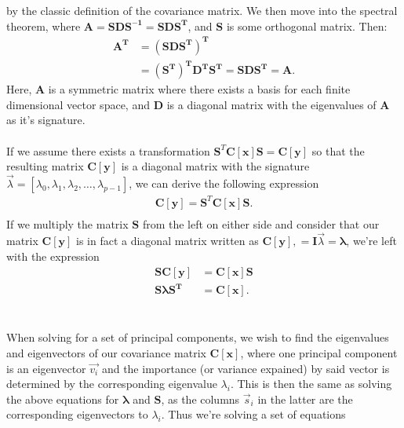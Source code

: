 by the classic definition of the covariance matrix. We then move into the spectral theorem, where $\boldsymbol{A} = \boldsymbol{SDS^{-1} = SD S^T}$, and $\boldsymbol{S}$ is some orthogonal matrix. Then:
\begin{equation}
\begin{split}
    \boldsymbol{A^T} & = \boldsymbol{(S D S^T)^{T}} \\ 
    & = \boldsymbol{ (S^T)^T D^T S^T =  S D S^T = A}.
\end{split}
\end{equation}
Here, $\boldsymbol{A}$ is a symmetric matrix where there exists a basis for each finite dimensional vector space, and $\boldsymbol{D}$ is a diagonal matrix with the eigenvalues of $\boldsymbol{A}$ as it's signature. 
\\
\\
If we assume there exists a transformation $\boldsymbol{S}^T\boldsymbol{C}[\boldsymbol{x}]\boldsymbol{S}=\boldsymbol{C}[\boldsymbol{y}]$ so that the resulting matrix $\boldsymbol{C}[\boldsymbol{y}]$ is a diagonal matrix with the signature $\vec{\lambda}= [\lambda_0,\lambda_1,\lambda_2,\dots,\lambda_{p-1}]$, 
we can derive the following expression
\begin{equation}
\begin{split}
\boldsymbol{C}[\boldsymbol{y}] = \boldsymbol{S}^T\boldsymbol{C}[\boldsymbol{x}]\boldsymbol{S}. \\
\end{split}
\end{equation}
If we multiply the matrix $\boldsymbol{S}$ from the left on either side and consider that our matrix $\boldsymbol{C}[\boldsymbol{y}]$ is in fact a diagonal matrix written as $\boldsymbol{C}[\boldsymbol{y}], = \boldsymbol{I}\vec{\lambda} = \boldsymbol{\lambda }$, we're left with the expression
\begin{equation}
\begin{split}
\boldsymbol{S}\boldsymbol{C}[\boldsymbol{y}] & = \boldsymbol{C}[\boldsymbol{x}]\boldsymbol{S} \\
\boldsymbol{S} \boldsymbol{\lambda}\boldsymbol{S^T} & = \boldsymbol{C}[\boldsymbol{x}].
\end{split}
\end{equation}
\\
\\
When solving for a set of principal components, we wish to find the eigenvalues and eigenvectors of our covariance matrix $\boldsymbol{C[x]}$, where one principal component is an eigenvector $\vec{v_i}$ and the importance (or variance expained) by said vector is determined by the corresponding eigenvalue $\lambda_i$. This is then the same as solving the above equations for $\boldsymbol{\lambda}$ and $\boldsymbol{S}$, as the columns $\vec{s}_i$ in the latter are the corresponding eigenvectors to $\lambda_i$. Thus we're solving a set of equations

